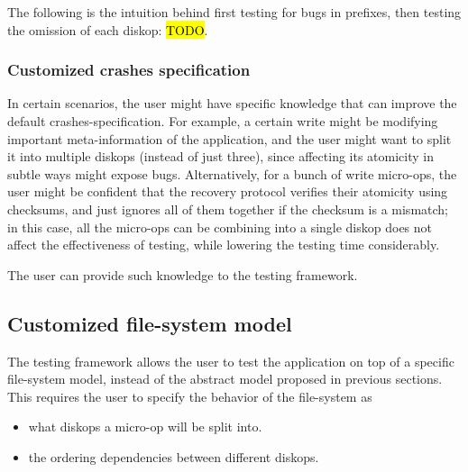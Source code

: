 The following is the intuition behind first testing for bugs in prefixes, then testing the omission of each diskop: \hl{TODO}.

\subsubsection{Customized crashes specification}
In certain scenarios, the user might have specific knowledge that can improve the default crashes-specification. For example, a certain write might be modifying important meta-information of the application, and the user might want to split it into multiple diskops (instead of just three), since affecting its atomicity in subtle ways might expose bugs. Alternatively, for a bunch of write micro-ops, the user might be confident that the recovery protocol verifies their atomicity using checksums, and just ignores all of them together if the checksum is a mismatch; in this case, all the micro-ops can be combining into a single diskop does not affect the effectiveness of testing, while lowering the testing time considerably.

The user can provide such knowledge to the testing framework.

\subsection{Customized file-system model}
The testing framework allows the user to test the application on top of a specific file-system model, instead of the abstract model proposed in previous sections. This requires the user to specify the behavior of the file-system as
\begin{itemize}
\item what diskops a micro-op will be split into.
\item the ordering dependencies between different diskops.
\end{itemize}
